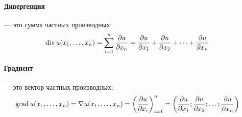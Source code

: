 \paragraph{Дивергенция}%
--- это сумма частных производных:
$$
	\operatorname{div} u(x_1, \dots, x_n) =
	\sum_{i=1}^n \frac{\partial u}{\partial x_n} =
	\frac{\partial u}{\partial x_1} + \frac{\partial u}{\partial x_2} +
	\dots + \frac{\partial u}{\partial x_n}
$$

\paragraph{Градиент}%
--- это вектор частных производных:
$$
	\operatorname{grad} u(x_1, \dots, x_n) =
	\nabla u(x_1, \dots, x_n) =
	\left( \frac{\partial u}{\partial x_i}\right)_{i=1}^{n} =
	\left( \frac{\partial u}{\partial x_1} ; \frac{\partial u}{\partial x_2} ;
	\dots; \frac{\partial u}{\partial x_n}\right)
$$
